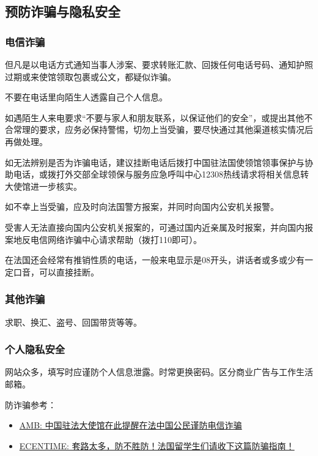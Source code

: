 \subsection{预防诈骗与隐私安全}
\subsubsection{电信诈骗}
但凡是以电话方式通知当事人涉案、要求转账汇款、回拨任何电话号码、通知护照过期或来使馆领取包裹或公文，都疑似诈骗。

不要在电话里向陌生人透露自己个人信息。

如遇陌生人来电要求“不要与家人和朋友联系，以保证他们的安全”，或提出其他不合常理的要求，应务必保持警惕，切勿上当受骗，要尽快通过其他渠道核实情况后再做处理。

如无法辨别是否为诈骗电话，建议挂断电话后拨打中国驻法国使领馆领事保护与协助电话，或拨打外交部全球领保与服务应急呼叫中心12308热线请求将相关信息转大使馆进一步核实。

如不幸上当受骗，应及时向法国警方报案，并同时向国内公安机关报警。

受害人无法直接向国内公安机关报案的，可通过国内近亲属及时报案，并向国内报案地反电信网络诈骗中心请求帮助（拨打110即可）。

在法国还会经常有推销性质的电话，一般来电显示是08开头，讲话者或多或少有一定口音，可以直接挂断。

\subsubsection{其他诈骗}
求职、换汇、盗号、回国带货等等。

\subsubsection{个人隐私安全}
网站众多，填写时应谨防个人信息泄露。时常更换密码。区分商业广告与工作生活邮箱。

防诈骗参考：
\begin{itemize}
    \item \href{http://www.amb-chine.fr/chn/sgxw/t1823322.htm}{AMB: 中国驻法大使馆在此提醒在法中国公民谨防电信诈骗}
    \item \href{https://www.ecentime.com/article/bien-vivre-en-france}{ECENTIME: 套路太多，防不胜防！法国留学生们请收下这篇防骗指南！}
\end{itemize}
